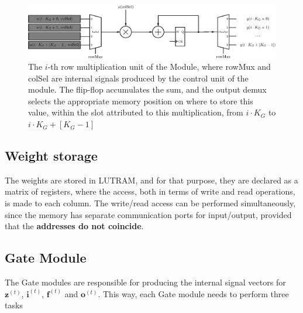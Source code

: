 \documentclass{IEEEtran}
\newcommand{\mb}[1]{\mathbf{#1}}
\begin{document}
\begin{figure}[!t]
    \centering
    \includegraphics[width=\linewidth]{figures/array-prod.eps}
    \caption{The $i$-th row multiplication unit of the Module, where rowMux and colSel are internal signals produced by the control unit of the module. The flip-flop accumulates the sum, and the output demux selects the appropriate memory position on where to store this value, within the slot attributed to this multiplication, from $i\cdot K_G$ to $i\cdot K_G + \left[K_G-1\right]$}
    \label{fig:array-prod}
\end{figure}

\subsection{Weight storage}\label{sec:proprarch_ram}
The weights are stored in LUTRAM, and for that purpose, they are declared as a matrix of registers, where the access, both in terms
of write and read operations, is made to each column. The write/read access can be performed simultaneously, since the memory has
separate communication ports for input/output, provided that the \textbf{addresses do not coincide}.

\subsection{Gate Module}\label{sec:proparch_gate}
The Gate modules are responsible for producing the internal signal vectors for $\mb{z}^{(t)}$, $\mb{i}^{(t)}$, $\mb{f}^{(t)}$ and $\mb{o}^{(t)}$. This way,
each Gate module needs to perform three tasks
\end{document}
